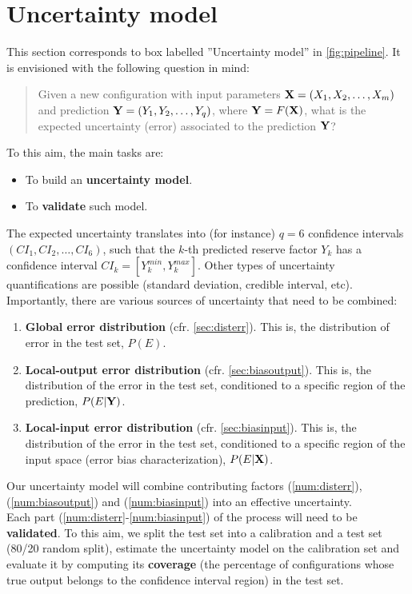 \section{Uncertainty model}\label{sec:uncertainty}
This section corresponds to box labelled ''Uncertainty model'' in \autoref{fig:pipeline}. It is envisioned with the following question in mind:
\begin{quotation}
	Given a new configuration with input parameters ${\bf X}=(X_1,X_2,\dots,X_m)$ and prediction ${\bf Y}=(Y_1,Y_2,\dots,Y_q)$, where ${\bf Y}=F({\bf X})$, what is the expected uncertainty (error) associated to the prediction $\bf Y$?
\end{quotation}
%
To this aim, the main tasks are:
\begin{itemize}
	\item To build an \textbf{uncertainty model}.
	\item To \textbf{validate} such model.\\
\end{itemize}
%
\indent The expected uncertainty translates into (for instance) $q=6$ confidence intervals $(CI_{1},CI_{2},\dots,CI_{6})$, such that the $k$-th predicted reserve factor $Y_k$ has a confidence interval $CI_k=[Y_k^{min},Y_k^{max}]$. Other types of uncertainty quantifications are possible (standard deviation, credible interval, etc).\\
%
\indent Importantly, there are various sources of uncertainty that need to be combined:
\begin{enumerate}
	\item \textbf{Global error distribution} (cfr. \autoref{sec:disterr}). This is, the distribution of error in the test set, $P(E)$.\label{num:disterr}
	\item \textbf{Local-output error distribution} (cfr. \autoref{sec:biasoutput}). This is, the distribution of the error in the test set, conditioned to a specific region of the prediction, $P(E|{\bf Y})$.\label{num:biasoutput}
	\item \textbf{Local-input error distribution} (cfr. \autoref{sec:biasinput}). This is, the distribution of the error in the test set, conditioned to a specific region of the input space (error bias characterization), $P(E|{\bf X})$.\label{num:biasinput}\\
\end{enumerate}
%
\indent Our uncertainty model will combine contributing factors (\ref{num:disterr}), (\ref{num:biasoutput}) and (\ref{num:biasinput}) into an effective uncertainty.\\
%
\indent Each part (\ref{num:disterr}-\ref{num:biasinput}) of the process will need to be \textbf{validated}. To this aim, we split the test set into a calibration and a test set (80/20 random split), estimate the uncertainty model on the calibration set and evaluate it by computing its \textbf{coverage} (\ie the percentage of configurations whose true output belongs to the confidence interval region) in the test set.\\
